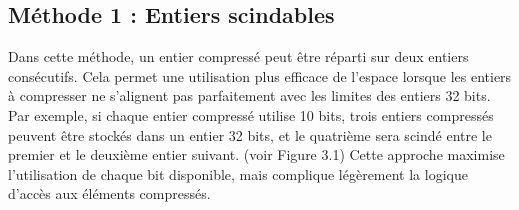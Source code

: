 \documentclass{rapportClass} %
\begin{document}
\subsection{Méthode 1 : Entiers scindables}
Dans cette méthode, un entier compressé peut être réparti sur deux entiers consécutifs.
Cela permet une utilisation plus efficace de l'espace lorsque les entiers à compresser ne s'alignent pas parfaitement avec les limites des entiers 32 bits.
Par exemple, si chaque entier compressé utilise 10 bits, trois entiers compressés peuvent être stockés dans un entier 32 bits,
et le quatrième sera scindé entre le premier et le deuxième entier suivant. (voir Figure 3.1)
Cette approche maximise l'utilisation de chaque bit disponible, mais complique légèrement la logique d'accès aux éléments compressés.
\begin{figure}[h!]
    \centering
\end{figure}
\end{document}
